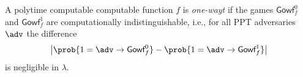 \begin{security}[OW]
\begin{codebox}
\begin{center}
\begin{pchstack}
\begin{pcvstack}
{					}
				\end{pcvstack}
			\end{pchstack}
		\end{center}
	\end{codebox}
	\iffalse
		\begin{center}
			\begin{pchstack}
				\pchspace
				\begin{pcvstack}
					\underline{\underline{$\textsf{Gowf}_f^0$}}\\
					\\
					\procedure{$\O{VALUE}(x)$}{
						\pcassert y = \bot
						y \sample \bin\\
						\pcreturn y}
					\pcvspace
					\procedure{$\O{INVERT}(x)$}{
						\pcassert k = \bot
						k \gets \O{GET} \\
						y' \gets f(k,x) \\
						\pcif y=y': \\
						\pcreturn 1 \\
						\pcelse \\
						\pcreturn 0 \\
					}
				\end{pcvstack}
				\pchspace
				\begin{pcvstack}
					\underline{\underline{$\textsf{Gowf}_f^0$}}\\
					\\
					\procedure{$\O{VALUE}(x)$}{
						\pcassert y = \bot
						y \sample \bin\\
						\pcreturn y}
					\pcvspace
					\procedure{$\O{CHECK}(x,y)$}{
						\pcassert k = \bot
						k \gets \O{GET} \\
						\pcreturn 0
					}
				\end{pcvstack}
			\end{pchstack}
		\end{center}
		\end{codebox}
	\fi

	A polytime computable computable function $f$ is \emph{one-wayt} 
	if the games $\textsf{Gowf}_f^0$ and $\textsf{Gowf}_f^1$ are
	computationally indistinguishable, i.e., 
	for all PPT adversaries $\adv$ the difference
	\[ \big|\prob{1 = \adv\rightarrow \textsf{Gowf}_f^0}
	  - \prob{1 = \adv\rightarrow \textsf{Gowf}_f^1}\big| \]
	is negligible in $\lambda$.
\end{security}
